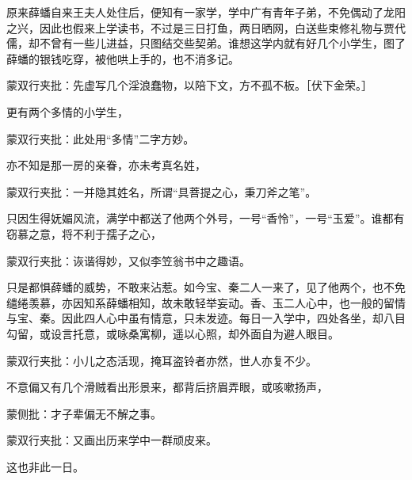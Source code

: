 \begin{parag}
    原来薛蟠自来王夫人处住后，便知有一家学，学中广有青年子弟，不免偶动了龙阳之兴，因此也假来上学读书，不过是三日打鱼，两日晒网，白送些束修礼物与贾代儒，却不曾有一些儿进益，只图结交些契弟。谁想这学内就有好几个小学生，图了薛蟠的银钱吃穿，被他哄上手的，也不消多记。\begin{note}蒙双行夹批：先虚写几个淫浪蠢物，以陪下文，方不孤不板。［伏下金荣。］\end{note}更有两个多情的小学生，\begin{note}蒙双行夹批：此处用“多情”二字方妙。\end{note}亦不知是那一房的亲眷，亦未考真名姓，\begin{note}蒙双行夹批：一并隐其姓名，所谓“具菩提之心，秉刀斧之笔”。\end{note}只因生得妩媚风流，满学中都送了他两个外号，一号“香怜”，一号“玉爱”。谁都有窃慕之意，将不利于孺子之心，\begin{note}蒙双行夹批：诙谐得妙，又似李笠翁书中之趣语。\end{note}只是都惧薛蟠的威势，不敢来沾惹。如今宝、秦二人一来了，见了他两个，也不免缱绻羡慕，亦因知系薛蟠相知，故未敢轻举妄动。香、玉二人心中，也一般的留情与宝、秦。因此四人心中虽有情意，只未发迹。每日一入学中，四处各坐，却八目勾留，或设言托意，或咏桑寓柳，遥以心照，却外面自为避人眼目。\begin{note}蒙双行夹批：小儿之态活现，掩耳盗铃者亦然，世人亦复不少。\end{note}不意偏又有几个滑贼看出形景来，都背后挤眉弄眼，或咳嗽扬声，\begin{note}蒙侧批：才子辈偏无不解之事。\end{note}\begin{note}蒙双行夹批：又画出历来学中一群顽皮来。\end{note}这也非此一日。
\end{parag}



